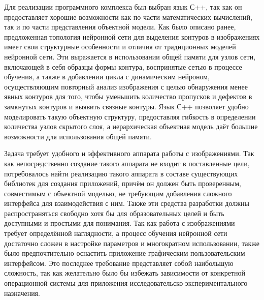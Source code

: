 \documentclass[a4paper,12pt]{report}
\begin{document}
Для реализации программного комплекса был выбран язык С++, так как он предоставляет хорошие возможности как по части математических вычислений, так и по части представления объектной модели. Как было описано ранее, предложенная топология нейронной сети для выделения контуров в изображениях имеет свои структурные особенности и отличия от традиционных моделей нейронной сети. Эти выражается в использовании общей памяти для узлов сети, включающей в себя образцы формы контура, воспринятые сетью в процессе обучения, а также в добавлении цикла с динамическим нейроном, осуществляющим повторный анализ изображения с целью обнаружения менее явных контуров для того, чтобы уменьшить количество пропусков и дефектов в замкнутых контуров и выявить связные контуры. Язык С++ позволяет удобно моделировать такую объектную структуру, предоставляя гибкость в определении количества узлов скрытого слоя, а иерархическая объектная модель даёт большие возможности для использования общей памяти.

Задача требует удобного и эффективного аппарата работы с изображениями. Так как непосредственно создание такого аппарата не входит в поставленные цели, потребовалось найти реализацию такого аппарата в составе существующих библиотек для создания приложений, причём он должен быть проверенным, совместимым с объектной моделью, не требующим добавления сложного интерфейса для взаимодействия с ним. Также эти средства разработки должны распространяться свободно хотя бы для образовательных целей и быть доступными и простыми для понимания. Так как работа с изображениями требует определённой наглядности, а процесс обучения нейронной сети достаточно сложен в настройке параметров и многократном использовании, также было предпочтительно оснастить приложение графическим пользовательским интерфейсом. Это последнее требование представляет собой наибольшую сложность, так как желательно было бы избежать зависимости от конкретной операционной системы для приложения исследовательско-экспериментального назначения. 
\end{document}
